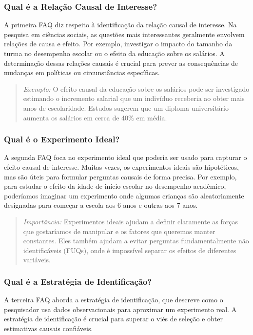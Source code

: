 \documentclass[a4paper,12pt]{article}[abntex2]
\begin{document}
\subsubsection{Qual é a Relação Causal de Interesse?}
A primeira FAQ diz respeito à identificação da relação causal de interesse. Na pesquisa em ciências sociais, as questões mais interessantes geralmente envolvem relações de causa e efeito. Por exemplo, investigar o impacto do tamanho da turma no desempenho escolar ou o efeito da educação sobre os salários. A determinação dessas relações causais é crucial para prever as consequências de mudanças em políticas ou circunstâncias específicas.

\begin{quote}
\textit{Exemplo:} O efeito causal da educação sobre os salários pode ser investigado estimando o incremento salarial que um indivíduo receberia ao obter mais anos de escolaridade. Estudos sugerem que um diploma universitário aumenta os salários em cerca de 40\% em média.
\end{quote}

\subsubsection{Qual é o Experimento Ideal?}
A segunda FAQ foca no experimento ideal que poderia ser usado para capturar o efeito causal de interesse. Muitas vezes, os experimentos ideais são hipotéticos, mas são úteis para formular perguntas causais de forma precisa. Por exemplo, para estudar o efeito da idade de início escolar no desempenho acadêmico, poderíamos imaginar um experimento onde algumas crianças são aleatoriamente designadas para começar a escola aos 6 anos e outras aos 7 anos.

\begin{quote}
\textit{Importância:} Experimentos ideais ajudam a definir claramente as forças que gostaríamos de manipular e os fatores que queremos manter constantes. Eles também ajudam a evitar perguntas fundamentalmente não identificáveis (FUQs), onde é impossível separar os efeitos de diferentes variáveis.
\end{quote}

\subsubsection{Qual é a Estratégia de Identificação?}
A terceira FAQ aborda a estratégia de identificação, que descreve como o pesquisador usa dados observacionais para aproximar um experimento real. A estratégia de identificação é crucial para superar o viés de seleção e obter estimativas causais confiáveis.
\end{document}
